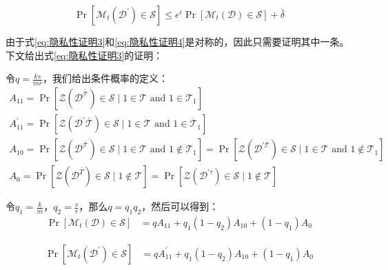 \begin{equation}\label{eq:隐私性证明4}
\operatorname{Pr}\left[\mathcal{M}_{t}\left(\mathcal{D}^{\prime}\right) \in \mathcal{S}\right] \leq e^{\bar{\epsilon}} \operatorname{Pr}\left[\mathcal{M}_{t}(\mathcal{D}) \in \mathcal{S}\right]+\bar{\delta}
\end{equation}

由于式\ref{eq:隐私性证明3}和\ref{eq:隐私性证明4}是对称的，因此只需要证明其中一条。下文给出式\ref{eq:隐私性证明3}的证明：

令$q=\frac{k s}{m r}$，我们给出条件概率的定义：
\begin{equation}\label{eq:隐私性证明5}
\begin{array}{l}
A_{11}=\operatorname{Pr}\left[\mathcal{Z}\left(\mathcal{D}^{\overline{\mathcal{T}}}\right) \in \mathcal{S} \mid 1 \in \mathcal{T} \text { and } 1 \in \mathcal{T}_{1}\right] \\
A_{11}^{\prime}=\operatorname{Pr}\left[\mathcal{Z}\left(\mathcal{D}^{\prime} \overline{\mathcal{T}}\right) \in \mathcal{S} \mid 1 \in \mathcal{T} \text { and } 1 \in \mathcal{T}_{1}\right] \\
A_{10}=\operatorname{Pr}\left[\mathcal{Z}\left(\mathcal{D}^{\overline{\mathcal{T}}}\right) \in \mathcal{S} \mid 1 \in \mathcal{T} \text { and } 1 \notin \mathcal{T}_{1}\right]=\operatorname{Pr}\left[\mathcal{Z}\left(\mathcal{D}^{\prime \overline{\mathcal{T}}}\right) \in \mathcal{S} \mid 1 \in \mathcal{T} \text { and } 1 \notin \mathcal{T}_{1}\right] \\
A_{0}=\operatorname{Pr}\left[\mathcal{Z}\left(\mathcal{D}^{\bar{T}}\right) \in \mathcal{S} \mid 1 \notin \mathcal{T}\right]=\operatorname{Pr}\left[\mathcal{Z}\left(\mathcal{D}^{\prime \bar{\tau}}\right) \in \mathcal{S} \mid 1 \notin \mathcal{T}\right]
\end{array}
\end{equation}

令$q_{1}=\frac{k}{m}$，$q_{2}=\frac{s}{r}$，那么$q=q_{1} q_{2}$，然后可以得到：
\begin{equation}\label{eq:隐私性证明6}
\begin{aligned} 
\operatorname{Pr}\left[\mathcal{M}_{t}(\mathcal{D}) \in \mathcal{S}\right] &=q A_{11}+q_{1}\left(1-q_{2}\right) A_{10}+\left(1-q_{1}\right) A_{0}
\end{aligned}
\end{equation}

\begin{equation}\label{eq:隐私性证明7}
\begin{aligned} 
\operatorname{Pr}\left[\mathcal{M}_{t}\left(\mathcal{D}^{\prime}\right) \in \mathcal{S}\right] &=q A_{11}^{\prime}+q_{1}\left(1-q_{2}\right) A_{10}+\left(1-q_{1}\right) A_{0} 
\end{aligned}
\end{equation}

